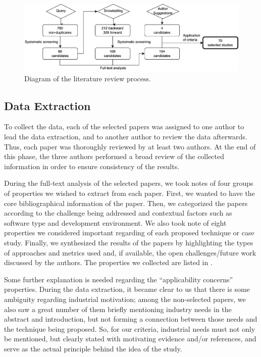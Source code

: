 \begin{figure}
  \center
  \includegraphics[width=0.8\linewidth]{figures/slr_tight.png}
  \caption{Diagram of the literature review process.}
  \label{fig:literature_review}
\end{figure}



\subsection{Data Extraction}
\label{subsec:extraction}


To collect the data, each of the selected papers was assigned to one author to lead the data extraction, and to another author to review the data afterwards.
Thus, each paper was thoroughly reviewed by at least two authors.
At the end of this phase, the three authors performed a broad review of the collected information in order to ensure consistency of the results.

During the full-text analysis of the selected papers, we took notes of four groups of properties we wished to extract from each paper.
First, we wanted to have the core bibliographical information of the paper.
Then, we categorized the papers according to the \rt challenge being addressed and contextual factors such as software type and development environment.
We also took note of eight properties we considered important regarding \rea of each proposed technique or case study.
Finally, we synthesized the results of the papers by highlighting the types of approaches and metrics used and, if available, the open challenges/future work discussed by the authors.
The properties we collected are listed in .

Some further explanation is needed regarding the ``applicability concerns'' properties.
During the data extraction, it became clear to us that there is some ambiguity regarding industrial motivation; among the non-selected papers, we also saw a great number of them briefly mentioning industry needs in the abstract and introduction, but not forming a connection between those needs and the technique being proposed.
So, for our criteria, industrial needs must not only be mentioned, but clearly stated with motivating evidence and/or references, and serve as the actual principle behind the idea of the study.

